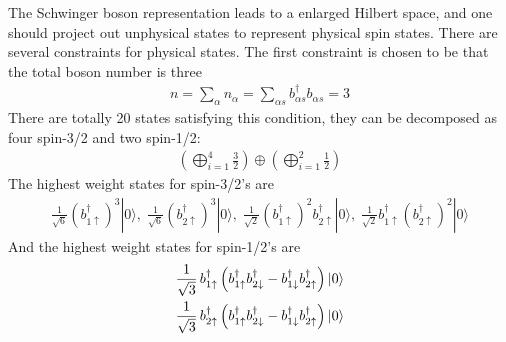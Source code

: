 \documentclass[%
 reprint,
 amsmath,amssymb,
 aps,
 pra, %
]{revtex4-1}
\newcommand{\dg}{\dagger}
\begin{document}
The Schwinger boson representation leads to a enlarged Hilbert space, and one should project out unphysical states to represent physical spin states. There are several constraints for physical states. The first constraint is chosen to be that the total boson number is three
\begin{align}
  n=\sum_{\alpha}n_\alpha=\sum_{\alpha s}b_{\alpha s}^\dg b_{\alpha s}=3
  \label{}
\end{align}
There are totally 20 states satisfying this condition, they can be decomposed as four spin-3/2 and two spin-1/2: 
\begin{align}
  \left( \bigoplus_{i=1}^4\frac{3}{2} \right) \oplus \left(  \bigoplus_{i=1}^2\frac{1}{2} \right)
  \label{}
\end{align}
The highest weight states for spin-3/2's are
\begin{align}
  \frac{1}{\sqrt{6}}\left(b_{1\uparrow}^\dg \right)^3|0\rangle,\;\frac{1}{\sqrt{6}}\left(b_{2\uparrow}^\dg \right)^3|0\rangle,\;\frac{1}{\sqrt{2}}\left( b_{1\uparrow}^\dg \right)^2 b_{2\uparrow}^\dg|0\rangle,\;\frac{1}{\sqrt{2}}b_{1\uparrow}^\dg \left(b_{2\uparrow}^\dg\right)^2|0\rangle 
  \label{}
\end{align}
And the highest weight states for spin-1/2's are
\begin{align}
  \frac{1}{\sqrt{3}}\,b_{1\uparrow}^\dg\left( b_{1\uparrow}^\dg b_{2\downarrow}^\dg-b_{1\downarrow}^\dg b_{2\uparrow}^\dg \right)|0\rangle\notag\\
  \frac{1}{\sqrt{3}}\,b_{2\uparrow}^\dg\left( b_{1\uparrow}^\dg b_{2\downarrow}^\dg-b_{1\downarrow}^\dg b_{2\uparrow}^\dg \right)|0\rangle
  \label{}
\end{align}
\end{document}
